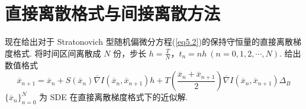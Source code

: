 \section{直接离散格式与间接离散方法}
现在给出对于 Stratonovich 型随机偏微分方程(\ref{eq5.2})的保持守恒量的直接离散梯度格式. 将时间区间离散成 $N$ 份，步长 $h = \frac TN$，$t_n= nh \ (n=0,1,2,\cdots,N)$. 给出数值格式
\begin{equation}\label{scheme_discrete_1}
	\overline{ x }_{n+1} = \overline x_n + S(\overline{ x }_n) \overline \nabla I(\overline{ x }_n,\overline{ x }_{n+1}) h + T\left( \frac{\overline{ x }_n + \overline{ x }_{n+1}}{2} \right)\overline \nabla I(\overline{ x }_n,\overline{ x }_{n+1}) \Delta_B
\end{equation}
$\{\overline x_n\}_{n=0}^N$ 为 SDE 在直接离散梯度格式下的近似解. 


